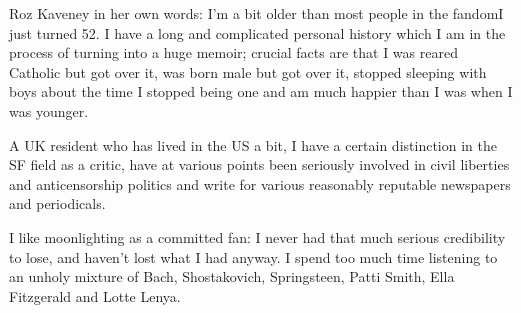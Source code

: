 {Roz Kaveney} in her own words: I'm a bit older than most people in the
fandom\textemdash I just turned 52. I have a long and complicated
personal history which I am in the process of turning into a huge
memoir; crucial facts are that I was reared Catholic but got over it,
was born male but got over it, stopped sleeping with boys about the
time I stopped being one and am much happier than I was when I was
younger.

A UK resident who has lived in the US a bit, I have a certain
distinction in the SF field as a critic, have at various points been
seriously involved in civil liberties and anticensorship politics and
write for various reasonably reputable newspapers and periodicals.

I like moonlighting as a committed fan: I never had that much serious
credibility to lose, and haven't lost what I had anyway. I spend too
much time listening to an unholy mixture of Bach, Shostakovich,
Springsteen, Patti Smith, Ella Fitzgerald and Lotte Lenya.
